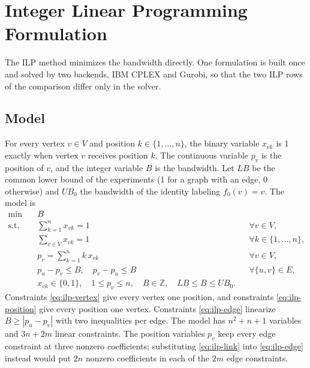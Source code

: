 
\section{Integer Linear Programming Formulation}\label{sec:ilp}

The ILP method minimizes the bandwidth directly. One formulation is built once and solved by two backends, IBM CPLEX and Gurobi, so that the two ILP rows of the comparison differ only in the solver.

\subsection{Model}\label{sec:ilp-model}

For every vertex $v \in V$ and position $k \in \{1, \ldots, n\}$, the binary variable $x_{vk}$ is 1 exactly when vertex $v$ receives position $k$. The continuous variable $p_v$ is the position of $v$, and the integer variable $B$ is the bandwidth. Let $LB$ be the common lower bound of the experiments (1 for a graph with an edge, 0 otherwise) and $UB_0$ the bandwidth of the identity labeling $f_0(v) = v$. The model is
\begin{align}
\min\quad & B \label{eq:ilp-objective}\\
\text{s.t.}\quad & \sum_{k=1}^{n} x_{vk} = 1 && \forall v \in V, \label{eq:ilp-vertex}\\
& \sum_{v \in V} x_{vk} = 1 && \forall k \in \{1, \ldots, n\}, \label{eq:ilp-position}\\
& p_v = \sum_{k=1}^{n} k\, x_{vk} && \forall v \in V, \label{eq:ilp-link}\\
& p_u - p_v \le B,\quad p_v - p_u \le B && \forall \{u, v\} \in E, \label{eq:ilp-edge}\\
& x_{vk} \in \{0, 1\},\quad 1 \le p_v \le n,\quad B \in \mathbb{Z},\quad LB \le B \le UB_0. \label{eq:ilp-domains}
\end{align}
Constraints \eqref{eq:ilp-vertex} give every vertex one position, and constraints \eqref{eq:ilp-position} give every position one vertex. Constraints \eqref{eq:ilp-edge} linearize $B \ge |p_u - p_v|$ with two inequalities per edge. The model has $n^2 + n + 1$ variables and $3n + 2m$ linear constraints. The position variables $p_v$ keep every edge constraint at three nonzero coefficients; substituting \eqref{eq:ilp-link} into \eqref{eq:ilp-edge} instead would put $2n$ nonzero coefficients in each of the $2m$ edge constraints.

